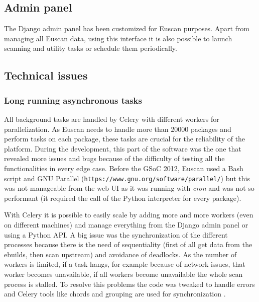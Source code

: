 \subsection{Admin panel}
The Django admin panel has been customized for Euscan purposes. Apart from managing all Euscan data, using this interface it is also possible to launch scanning and utility tasks or schedule them periodically.


\subsection{Technical issues}
\subsubsection{Long running asynchronous tasks}
All background tasks are handled by Celery with different workers for parallelization. As Euscan needs to handle more than 20000 packages and perform tasks on each package, these tasks are crucial for the reliability of the platform. During the development, this part of the software was the one that revealed more issues and bugs because of the difficulty of testing all the functionalities in every edge case. Before the GSoC 2012, Euscan used a Bash script and GNU Parallel (\texttt{https://www.gnu.org/software/parallel/}) but this was not manageable from the web UI as it was running with \emph{cron} and was not so performant (it required the call of the Python interpreter for every package).

With Celery it is possible to easily scale by adding more and more workers (even on different machines) and manage everything from the Django admin panel or using a Python API.
A big issue was the synchronization of the different processes because there is the need of sequentiality (first of all get data from the ebuilds, then scan upstream) and avoidance of deadlocks. As the number of workers is limited, if a task hangs, for example because of network issues, that worker becomes unavailable, if all workers become unavailable the whole scan process is stalled. To resolve this problems the code was tweaked to handle errors and Celery tools like chords and grouping are used for synchronization \cite{celery_doc}.

